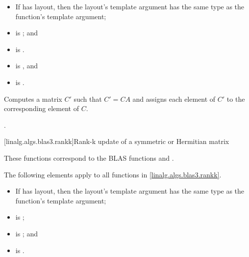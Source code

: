 \begin{itemdescr}
\pnum
\mandates
\begin{itemize}
\item
If  has  layout,
then the layout's  template argument has
the same type as the function's  template argument;
\item
{}
is ; and
\item
{} is .
\end{itemize}

\pnum
\expects
\begin{itemize}
\item
{} is , and
\item
{} is .
\end{itemize}

\pnum
\effects
Computes a matrix $C'$ such that $C' = C A$ and
assigns each element of $C'$ to the corresponding element of $C$.

\pnum
\complexity
{}.
\end{itemdescr}

[linalg.algs.blas3.rankk]{Rank-k update of a symmetric or Hermitian matrix}

\pnum
\begin{note}
These functions correspond to the BLAS functions
 and \supercite{blas3}.
\end{note}

\pnum
The following elements apply to all functions in \ref{linalg.algs.blas3.rankk}.

\pnum
\mandates
\begin{itemize}
\item
If  has  layout,
then the layout's  template argument has
the same type as the function's  template argument;
\item
{}
is ;
\item
{}
is ; and
\item
{}
is .
\end{itemize}

